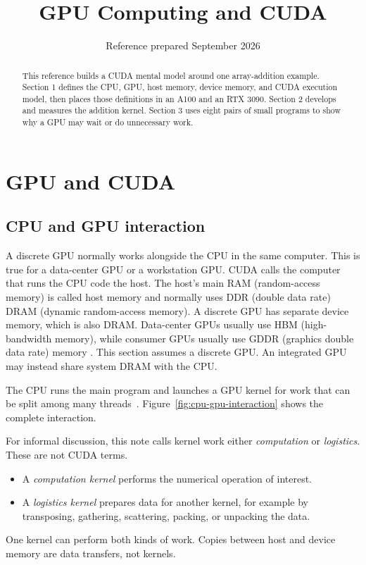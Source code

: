 \documentclass[11pt]{article}
\title{GPU Computing and CUDA}
\author{}
\date{Reference prepared September 2026}
\numberwithin{equation}{section}
\numberwithin{figure}{section}
\numberwithin{table}{section}
\begin{document}
\hypersetup{pageanchor=false}
\maketitle

\begin{abstract}
This reference builds a CUDA mental model around one array-addition example.
Section 1 defines the CPU, GPU, host memory, device memory, and CUDA execution
model, then places those definitions in an A100 and an RTX 3090.  Section 2
develops and measures the addition kernel.  Section 3 uses
eight pairs of small programs to show why a GPU may wait or do unnecessary work.
\end{abstract}

\clearpage
\hypersetup{pageanchor=true}
\tableofcontents
\clearpage
{}

\section{GPU and CUDA}

\subsection{CPU and GPU interaction}
\label{chap:origins}
\label{chap:getting-started}

A discrete GPU normally works alongside the CPU in the same computer.  This is true
for a data-center GPU or a workstation GPU.
CUDA calls the computer that runs the CPU code the host.  The host's main RAM
(random-access memory) is called host memory and normally uses DDR (double data
rate) DRAM (dynamic random-access memory).  A discrete GPU has separate device memory,
which is also DRAM.  Data-center GPUs usually use HBM (high-bandwidth memory), while
consumer GPUs usually use GDDR (graphics double data rate) memory
\cite{ampere2020,ga102whitepaper}.  This section assumes a discrete GPU.  An
integrated GPU may instead share system DRAM with the CPU.

The CPU runs the main program and launches a GPU kernel for work that can be split
among many threads~\cite{gupta2020origins}.  Figure~\ref{fig:cpu-gpu-interaction}
shows the complete interaction.

For informal discussion, this note calls kernel work either \emph{computation} or
\emph{logistics}.  These are not CUDA terms.
\begin{itemize}
  \item A \emph{computation kernel} performs the numerical operation of interest.
  \item A \emph{logistics kernel} prepares data for another kernel, for example by
  transposing, gathering, scattering, packing, or unpacking the data.
\end{itemize}
One kernel can perform both kinds of work.  Copies between host and device memory
are data transfers, not kernels.
\end{document}
